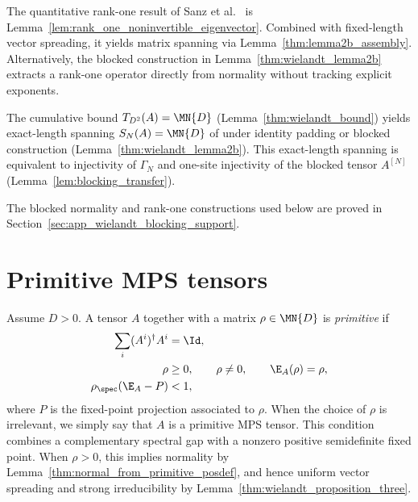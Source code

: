 \begin{remark}
    \label{rem:lemma2b_status}\leanok
    The quantitative rank-one result of Sanz et al.~\cite[Lemma~2(b)]{Sanz2010Quantum}
    is Lemma~\ref{lem:rank_one_noninvertible_eigenvector}. Combined with
    fixed-length vector spreading, it yields matrix spanning via
    Lemma~\ref{thm:lemma2b_assembly}. Alternatively, the blocked construction in
    Lemma~\ref{thm:wielandt_lemma2b} extracts a rank-one operator directly from
    normality without tracking explicit exponents.
\end{remark}

\begin{remark}
    The cumulative bound $T_{D^2}(A)=\MN{D}$ (Lemma~\ref{thm:wielandt_bound})
    yields exact-length spanning $S_N(A)=\MN{D}$ of \cite[Theorem~1]{Sanz2010Quantum}
    under identity padding or blocked construction (Lemma~\ref{thm:wielandt_lemma2b}).
    This exact-length spanning is equivalent to injectivity of $\Gamma_N$ and
    one-site injectivity of the blocked tensor $A^{[N]}$ (Lemma~\ref{lem:blocking_transfer}).
\end{remark}

The blocked normality and rank-one constructions used below are proved in
Section~\ref{sec:app_wielandt_blocking_support}.

\section{Primitive MPS tensors}

\begin{definition}\label{def:primitive_mps}
    \leanok
    Assume $D>0$.
    A tensor $A$ together with a matrix $\rho\in\MN{D}$ is
    \emph{primitive} if
    \begin{align}
        \sum_i(A^i)^\dagger A^i
         & =\Id, \notag                                         \\
        \rho
         & \ge0,\qquad \rho\neq0,\qquad \E_A(\rho)=\rho, \notag \\
        \rho_{\spec}(\E_A-P)
         & <1,
        \notag
    \end{align}
    where $P$ is the fixed-point projection associated to $\rho$.
    When the choice of $\rho$ is irrelevant, we simply say that $A$
    is a primitive MPS tensor.
    This condition combines a complementary spectral gap with a nonzero
    positive semidefinite fixed point. When $\rho>0$, this implies normality
    by Lemma~\ref{thm:normal_from_primitive_posdef}, and hence uniform vector
    spreading and strong irreducibility by
    Lemma~\ref{thm:wielandt_proposition_three}.
\end{definition}

